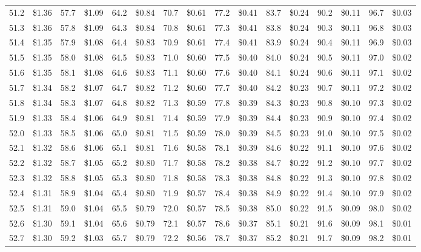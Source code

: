 \documentclass{article}
\begin{document}
\begin{tabular}{|*{8}{rr|}}
51.2 & \$1.36 & 57.7 & \$1.09 & 64.2 & \$0.84 & 70.7 & \$0.61 & 77.2 & \$0.41 & 83.7 & \$0.24 & 90.2 & \$0.11 & 96.7 & \$0.03\\
51.3 & \$1.36 & 57.8 & \$1.09 & 64.3 & \$0.84 & 70.8 & \$0.61 & 77.3 & \$0.41 & 83.8 & \$0.24 & 90.3 & \$0.11 & 96.8 & \$0.03\\
51.4 & \$1.35 & 57.9 & \$1.08 & 64.4 & \$0.83 & 70.9 & \$0.61 & 77.4 & \$0.41 & 83.9 & \$0.24 & 90.4 & \$0.11 & 96.9 & \$0.03\\
51.5 & \$1.35 & 58.0 & \$1.08 & 64.5 & \$0.83 & 71.0 & \$0.60 & 77.5 & \$0.40 & 84.0 & \$0.24 & 90.5 & \$0.11 & 97.0 & \$0.02\\
51.6 & \$1.35 & 58.1 & \$1.08 & 64.6 & \$0.83 & 71.1 & \$0.60 & 77.6 & \$0.40 & 84.1 & \$0.24 & 90.6 & \$0.11 & 97.1 & \$0.02\\
51.7 & \$1.34 & 58.2 & \$1.07 & 64.7 & \$0.82 & 71.2 & \$0.60 & 77.7 & \$0.40 & 84.2 & \$0.23 & 90.7 & \$0.11 & 97.2 & \$0.02\\
51.8 & \$1.34 & 58.3 & \$1.07 & 64.8 & \$0.82 & 71.3 & \$0.59 & 77.8 & \$0.39 & 84.3 & \$0.23 & 90.8 & \$0.10 & 97.3 & \$0.02\\
51.9 & \$1.33 & 58.4 & \$1.06 & 64.9 & \$0.81 & 71.4 & \$0.59 & 77.9 & \$0.39 & 84.4 & \$0.23 & 90.9 & \$0.10 & 97.4 & \$0.02\\
52.0 & \$1.33 & 58.5 & \$1.06 & 65.0 & \$0.81 & 71.5 & \$0.59 & 78.0 & \$0.39 & 84.5 & \$0.23 & 91.0 & \$0.10 & 97.5 & \$0.02\\
52.1 & \$1.32 & 58.6 & \$1.06 & 65.1 & \$0.81 & 71.6 & \$0.58 & 78.1 & \$0.39 & 84.6 & \$0.22 & 91.1 & \$0.10 & 97.6 & \$0.02\\
52.2 & \$1.32 & 58.7 & \$1.05 & 65.2 & \$0.80 & 71.7 & \$0.58 & 78.2 & \$0.38 & 84.7 & \$0.22 & 91.2 & \$0.10 & 97.7 & \$0.02\\
52.3 & \$1.32 & 58.8 & \$1.05 & 65.3 & \$0.80 & 71.8 & \$0.58 & 78.3 & \$0.38 & 84.8 & \$0.22 & 91.3 & \$0.10 & 97.8 & \$0.02\\
52.4 & \$1.31 & 58.9 & \$1.04 & 65.4 & \$0.80 & 71.9 & \$0.57 & 78.4 & \$0.38 & 84.9 & \$0.22 & 91.4 & \$0.10 & 97.9 & \$0.02\\
52.5 & \$1.31 & 59.0 & \$1.04 & 65.5 & \$0.79 & 72.0 & \$0.57 & 78.5 & \$0.38 & 85.0 & \$0.22 & 91.5 & \$0.09 & 98.0 & \$0.02\\
52.6 & \$1.30 & 59.1 & \$1.04 & 65.6 & \$0.79 & 72.1 & \$0.57 & 78.6 & \$0.37 & 85.1 & \$0.21 & 91.6 & \$0.09 & 98.1 & \$0.01\\
52.7 & \$1.30 & 59.2 & \$1.03 & 65.7 & \$0.79 & 72.2 & \$0.56 & 78.7 & \$0.37 & 85.2 & \$0.21 & 91.7 & \$0.09 & 98.2 & \$0.01\\

\end{tabular}
\end{document}
